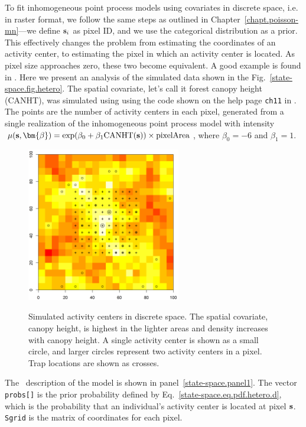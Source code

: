 To fit inhomogeneous point process models using covariates in discrete
space, i.e. in raster format, we follow the same steps
as outlined in Chapter~\ref{chapt.poisson-mn}---we define ${\bf s}_i$ as
pixel ID, and we use the categorical distribution as a prior. This
effectively changes the problem from estimating the coordinates of an
activity center, to estimating the pixel in which an activity center is
located. As pixel size approaches zero, these two become equivalent. A good
example is found in \citep{mollet_etal:2012}. Here we present
an analysis of the simulated data shown in the %
Fig.~\ref{state-space.fig.hetero}. The spatial covariate, let's call it
forest canopy height (CANHT), was simulated
using using the code shown on the help page
\verb+ch11+ in \scrbook. The points are the number of
activity centers in each pixel, generated from a single realization of
the inhomogeneous point process model with intensity
$\mu(\mathbf{s}, \bm{\beta}) = \exp(\beta_0 + \beta_1
\text{CANHT}({\bf s}))\times\text{pixelArea}$,
where $\beta_0 = -6$ and $\beta_1 = 1$.
\begin{figure}[ht]
\centering
\includegraphics[width=0.6\textwidth]{Ch11/figs/discrete}
\label{state-space.fig.discrete}
\caption{Simulated activity centers in discrete space. The spatial
  covariate, canopy height, is highest in the lighter areas and
  density increases with canopy height. A single
  activity center is shown as a small circle, and larger circles
  represent two activity centers in a pixel. Trap locations
  are shown as crosses.}
\end{figure}

The \bugs~description of the model is shown in
panel~\ref{state-space.panel1}. The vector \verb+probs[]+ is the prior
probability defined by Eq.~\ref{state-space.eq.pdf.hetero.d}, which is
the probability that an individual's activity center is located at
pixel $\bf s$. \verb+Sgrid+ is the matrix of coordinates for each pixel.

